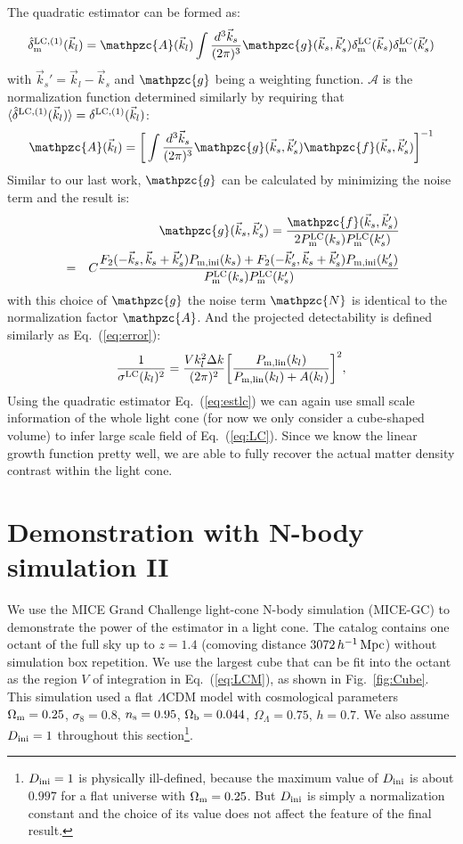 \documentclass[prd,amsmath,amssymb,floatfix,superscriptaddress,nofootinbib,twocolumn]{revtex4-1}
\def\be{\begin{equation}}
\def\ee{\end{equation}}
\newcommand{\LC}{\rm LC}
\newcommand{\ini}{\rm ini}
\newcommand{\vs}{\nonumber\\}
\newcommand{\vk}{\vec{k}}
\newcommand{\ec}[1]{Eq.~(\ref{eq:#1})}
\newcommand{\eql}[1]{\label{eq:#1}}
\newcommand{\rf}[1]{\ref{fig:#1}}
\begin{document}
The quadratic estimator can be formed as:
\be
\hat{\delta}^{\rm LC,(1)}_{\rm m}(\vk_l)=\mathpzc{A}(\vk_l)\int \frac{d^{3}\vk_s}{(2\pi)^3} \mathpzc{g}(\vk_s,\vk_s')\delta^{\LC}_{\rm m}(\vk_s)\delta^{\LC}_{\rm m}(\vk_s') \eql{estlc}
\ee 
with $\vk_s' = \vk_l-\vk_s$ and $\mathpzc{g}$ being a weighting function. $\mathcal{A}$ is the normalization function determined similarly by requiring that $\langle \hat{\delta}^{\rm LC,(1)}(\vec{k}_l) \rangle={\delta}^{\rm LC,(1)}(\vec{k}_l)$:
\begin{eqnarray}
\mathpzc{A}(\vec{k}_l)=\bigg[\int \frac{d^3 \vec{k}_s}{(2\pi)^3} \mathpzc{g}(\vec{k}_s,\vec{k}_s')\mathpzc{f}(\vec{k}_s,\vec{k}_s')  \bigg]^{-1} \eql{a}
\end{eqnarray}
Similar to our last work, $\mathpzc{g}$ can be calculated by minimizing the noise term and the result is:
\begin{eqnarray}
&&\mathpzc{g}(\vec{k}_{s},\vec{k}_{s}')
=\frac{\mathpzc{f}(\vec{k}_{s},\vec{k}_{s}')}{2P^{\rm LC}_{\rm m}(k_{s})P^{\rm LC}_{\rm m}(k_{s}')}\vs
&=&C\frac{F_2(-\vec{k}_s,\vec{k}_s+\vec{k}_s')P_{\rm m,ini}(k_s)+F_2(-\vec{k}_s',\vec{k}_s+\vec{k}_s')P_{\rm m,ini}(k_s')}{P^{\rm LC}_{\rm m}(k_{s})P^{\rm LC}_{\rm m}(k_{s}')}\vs 
\end{eqnarray} 
with this choice of $\mathpzc{g}$ the noise term $\mathpzc{N}$ is identical to the normalization factor $\mathpzc{A}$. And the projected detectability is defined similarly as \ec{error}:
\be
\frac{1}{\sigma^{\rm LC}(k_l)^2}=\frac{V k_l^2 \Delta k }{(2\pi)^2}\bigg[\frac{P_{\rm m,lin}(k_l)}{P_{\rm m,lin}(k_l)+A(k_l) }\bigg]^2 \eql{error1},
\ee
Using the quadratic estimator \ec{estlc} we can again use small scale information of the whole light cone (for now we only consider a cube-shaped volume) to infer large scale field of \ec{LC}. Since we know the linear growth function pretty well, we are able to fully recover the actual matter density contrast within the light cone.

\section{Demonstration with N-body simulation II} \label{sec6}
\noindent We use the MICE Grand Challenge light-cone N-body simulation (MICE-GC) \cite{Fosalba:2015MI}\cite{Fosalba:2015MII} to demonstrate the power of the estimator in a light cone. The catalog contains one octant of the full sky up to $z = 1.4$ (comoving distance $3072\, h^{-1}\, \rm Mpc$) without simulation box repetition. We use the largest cube that can be fit into the octant as the region $V$ of integration in \ec{LCM}, as shown in Fig.~\rf{Cube}. This simulation used a flat $\Lambda$CDM model with cosmological parameters $ \Omega_{\rm m}=0.25$, $\sigma_8 = 0.8$, $n_{\rm s}=0.95$, $\Omega_{\rm b}=0.044$, $\Omega_{\Lambda}=0.75$, $h=0.7$. We also assume $D_{\ini}=1$ throughout this section\footnote{$D_{\rm ini}=1$ is physically ill-defined, because the maximum value of $D_{\rm ini}$ is about $0.997$ for a flat universe with $\Omega_{\rm m}=0.25$. But $D_{\rm ini}$ is simply a normalization constant and the choice of its value does not affect the feature of the final result.}.
\end{document}
